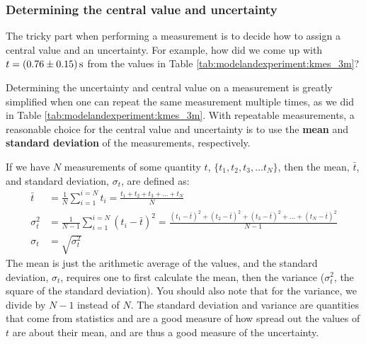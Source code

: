 \subsubsection{Determining the central value and uncertainty}
\label{sec:modelandexperiment:determiningu}
The tricky part when performing a measurement is to decide how to assign a central value and an uncertainty. For example, how did we come up with $t=\SI{0.76 \pm 0.15}{s}$ from the values in Table \ref{tab:modelandexperiment:kmes_3m}? 

Determining the uncertainty and central value on a measurement is greatly simplified when one can repeat the same measurement multiple times, as we did in Table \ref{tab:modelandexperiment:kmes_3m}. With repeatable measurements, a reasonable choice for the central value and uncertainty is to use the \textbf{mean} and \textbf{standard deviation} of the measurements, respectively.

If we have $N$ measurements of some quantity $t$, $\{t_1, t_2, t_3, \dots t_N\}$, then the mean, $\bar t$, and standard deviation, $\sigma_t$, are defined as:
\begin{align}
\bar t &= \frac{1}{N}\sum_{i=1}^{i=N} t_i=\frac{t_1 +t_2 +t_3 +\dots+ t_N}{N} \\
\sigma_t^2 &=\frac{1}{N-1}\sum_{i=1}^{i=N}(t_i-\bar t)^2 = \frac{(t_1-\bar t)^2+(t_2-\bar t)^2+(t_3-\bar t)^2+\dots+(t_N-\bar t)^2}{N-1} \\
\sigma_t &=\sqrt{\sigma_t^2}
\end{align}
The mean is just the arithmetic average of the values, and the standard deviation, $\sigma_t$, requires one to first calculate the mean, then the variance ($\sigma^2_t$, the square of the standard deviation). You should also note that for the variance, we divide by $N-1$ instead of $N$. The standard deviation and variance are quantities that come from statistics and are a good measure of how spread out the values of $t$ are about their mean, and are thus a good measure of the uncertainty.

